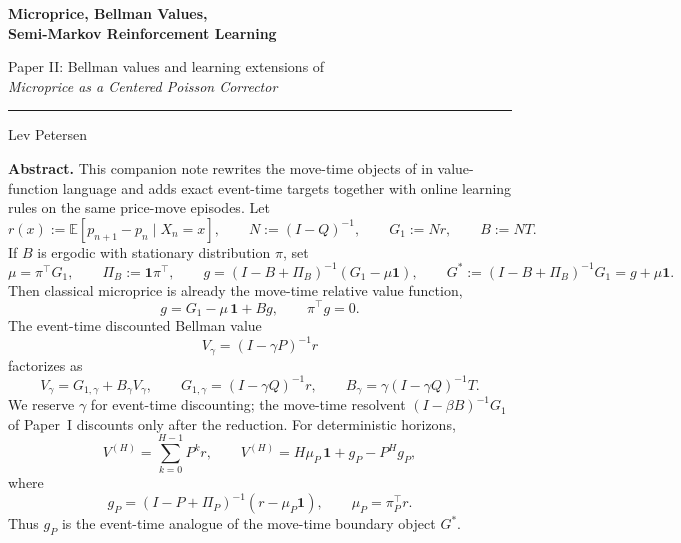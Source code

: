 \documentclass[11pt,twoside]{article}
\theoremstyle{plain}
\theoremstyle{definition}
\theoremstyle{remark}
\newcommand{\1}{\mathbf{1}}
\newcommand{\E}{\mathbb{E}}
\newcommand{\PiB}{\Pi_B}
\newcommand{\PiP}{\Pi_P}
\begin{document}
\begin{titlepage}
\centering

\vspace*{1.4cm}

{\Huge\bfseries\color{sectioncolor} Microprice, Bellman Values,\\[0.5em]
Semi-Markov Reinforcement Learning\par}

\vspace{0.45cm}

{\large\color{sectioncolor} Paper II: Bellman values and learning extensions of\\[0.3em]
\textit{Microprice as a Centered Poisson Corrector}\par}

\vspace{0.4cm}
{\color{sectioncolor}\rule{0.52\textwidth}{0.8pt}}

\vspace{1.0cm}

{\Large Lev Petersen\par}

\vspace{1.3cm}

\begin{minipage}{0.86\textwidth}
\small
\noindent\textbf{Abstract.}
This companion note rewrites the move-time objects of \cite{Petersen2025} in value-function language and adds exact event-time targets together with online learning rules on the same price-move episodes. Let
\[
r(x):=\E[p_{n+1}-p_n\mid X_n=x],
\qquad
N:=(I-Q)^{-1},
\qquad
G_1:=Nr,
\qquad
B:=NT.
\]
If $B$ is ergodic with stationary distribution $\pi$, set
\[
\mu=\pi^\top G_1,
\qquad
\PiB:=\1\pi^\top,
\qquad
g=(I-B+\PiB)^{-1}(G_1-\mu\1),
\qquad
G^*:=(I-B+\PiB)^{-1}G_1=g+\mu\1.
\]
Then classical microprice is already the move-time relative value function,
\[
g=G_1-\mu\,\1+Bg,
\qquad
\pi^\top g=0.
\]
The event-time discounted Bellman value
\[
V_\gamma=(I-\gamma P)^{-1}r
\]
factorizes as
\[
V_\gamma=G_{1,\gamma}+B_\gamma V_\gamma,
\qquad
G_{1,\gamma}=(I-\gamma Q)^{-1}r,
\qquad
B_\gamma=\gamma(I-\gamma Q)^{-1}T.
\]
We reserve $\gamma$ for event-time discounting; the move-time resolvent $(I-\beta B)^{-1}G_1$ of Paper~I discounts only after the reduction. For deterministic horizons,
\[
V^{(H)}=\sum_{k=0}^{H-1}P^k r,
\qquad
V^{(H)}=H\mu_P\,\1+g_P-P^H g_P,
\]
where
\[
g_P=(I-P+\PiP)^{-1}(r-\mu_P\1),
\qquad
\mu_P=\pi_P^\top r.
\]
Thus $g_P$ is the event-time analogue of the move-time boundary object $G^*$.


\end{minipage}
\end{titlepage}
\end{document}
